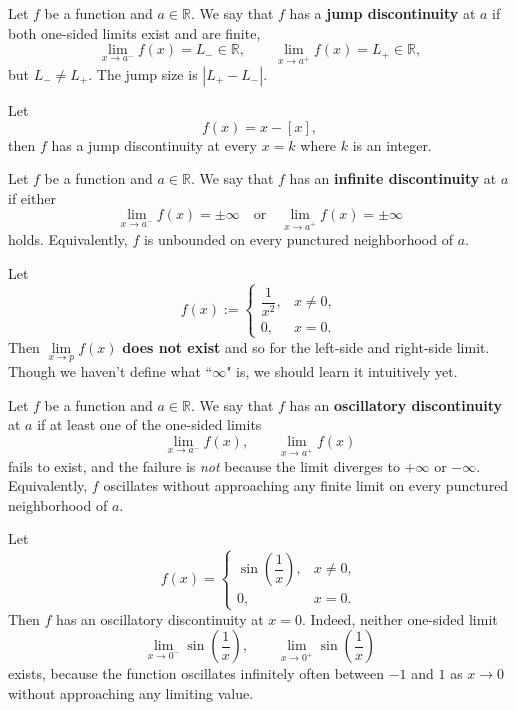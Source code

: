 \documentclass[a4paper]{ctexart}
\begin{document}
	\begin{mydef}
		Let $f$ be a function and $a\in\mathbb{R}$. We say that $f$ has a \textbf{jump discontinuity} at $a$ if both one-sided limits exist and are finite,
		\[
		\lim_{x\to a^-} f(x)=L_- \in \mathbb{R},\qquad
		\lim_{x\to a^+} f(x)=L_+ \in \mathbb{R},
		\]
		but $L_- \neq L_+$. The jump size is $|L_+-L_-|$.
	\end{mydef}
	
	\begin{myex}
		Let
		\[
		f(x)=x-\left[ x\right],
		\]
		then $f$ has a jump discontinuity at every $x=k$ where $k$ is an integer.
	\end{myex}
	
	\begin{mydef}
		Let $f$ be a function and $a\in\mathbb{R}$. We say that $f$ has an \textbf{infinite discontinuity} at $a$ if either
		\[
		\lim_{x\to a^-} f(x)=\pm\infty \quad \text{or} \quad
		\lim_{x\to a^+} f(x)=\pm\infty
		\]
		holds. Equivalently, $f$ is unbounded on every punctured neighborhood of $a$.
	\end{mydef}
	
	\begin{myex}
		Let
		\[
		f(x):=
		\begin{cases}
			\dfrac{1}{x^2}, & x \neq 0,\\[6pt]
			0,  & x = 0.
		\end{cases}
		\]
		Then $\lim\limits_{x\to p}f(x)$ \textbf{does not exist} and so for the left-side and right-side limit. Though we haven't define what ``$\infty$" is, we should learn it intuitively yet.
	\end{myex}

	\begin{mydef}
		Let $f$ be a function and $a\in\mathbb{R}$. 
		We say that $f$ has an \textbf{oscillatory discontinuity} at $a$ if at least one of the one-sided limits
		\[
		\lim_{x\to a^-} f(x), \qquad \lim_{x\to a^+} f(x)
		\]
		fails to exist, and the failure is \emph{not} because the limit diverges to 
		$+\infty$ or $-\infty$. Equivalently, $f$ oscillates without approaching any 
		finite limit on every punctured neighborhood of $a$.
	\end{mydef}

	\begin{myex}
		Let 
		\[
		f(x)=
		\begin{cases}
			\sin\left(\dfrac{1}{x}\right), & x\neq 0,\\[4pt]
			0, & x=0.
		\end{cases}
		\]
		Then $f$ has an oscillatory discontinuity at $x=0$. Indeed,
		neither one-sided limit 
		\[
		\lim_{x\to0^-}\sin\left(\dfrac{1}{x}\right), \qquad 
		\lim_{x\to0^+}\sin\left(\dfrac{1}{x}\right)
		\]
		exists, because the function oscillates infinitely often between $-1$ and $1$
		as $x\to 0$ without approaching any limiting value.
	\end{myex}
\end{document}
